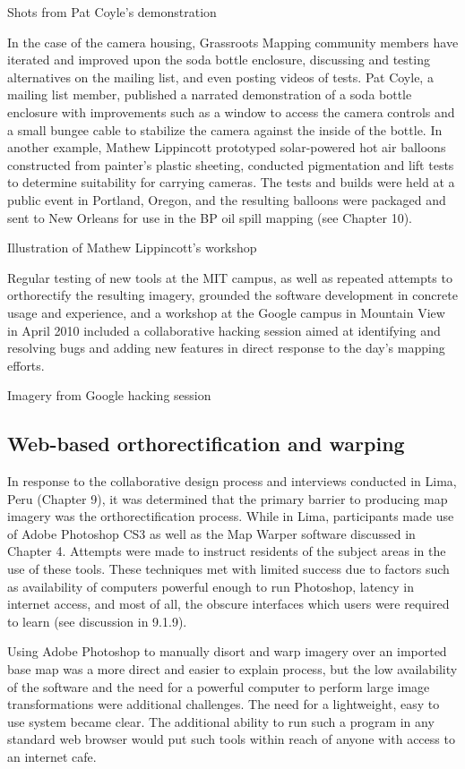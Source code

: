 \documentclass[11pt]{report}
\begin{document}
Shots from Pat Coyle's demonstration

In the case of the camera housing, Grassroots Mapping community members have iterated and improved upon the soda bottle enclosure, discussing and testing alternatives on the mailing list, and even posting videos of tests. Pat Coyle, a mailing list member, published a narrated demonstration of a soda bottle enclosure with improvements such as a window to access the camera controls and a small bungee cable to stabilize the camera against the inside of the bottle. In another example, Mathew Lippincott prototyped solar-powered hot air balloons constructed from painter's plastic sheeting, conducted pigmentation and lift tests to determine suitability for carrying cameras. The tests and builds were held at a public event in Portland, Oregon, and the resulting balloons were packaged and sent to New Orleans for use in the BP oil spill mapping (see Chapter 10). 

Illustration of Mathew Lippincott's workshop 

Regular testing of new tools at the MIT campus, as well as repeated attempts to orthorectify the resulting imagery, grounded the software development in concrete usage and experience, and a workshop at the Google campus in Mountain View in April 2010 included a collaborative hacking session aimed at identifying and resolving bugs and adding new features in direct response to the day's mapping efforts. 

Imagery from Google hacking session

\subsection{Web-based orthorectification and warping}

In response to the collaborative design process and interviews conducted in Lima, Peru (Chapter 9), it was determined that the primary barrier to producing map imagery was the orthorectification process. While in Lima, participants made use of Adobe Photoshop CS3 as well as the Map Warper software discussed in Chapter 4. Attempts were made to instruct residents of the subject areas in the use of these tools. These techniques met with limited success due to factors such as availability of computers powerful enough to run Photoshop, latency in internet access, and most of all, the obscure interfaces which users were required to learn (see discussion in 9.1.9).  

Using Adobe Photoshop to manually disort and warp imagery over an imported base map was a more direct and easier to explain process, but the low availability of the software and the need for a powerful computer to perform large image transformations were additional challenges. The need for a lightweight, easy to use system became clear. The additional ability to run such a program in any standard web browser would put such tools within reach of anyone with access to an internet cafe.
\end{document}
